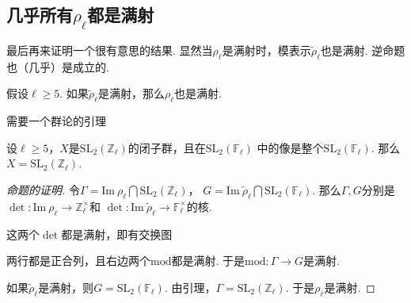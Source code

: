 \subsection{几乎所有\texorpdfstring{$\rho_{\ell}$}{rho ell}都是满射}

最后再来证明一个很有意思的结果.
显然当$\rho_{\ell}$是满射时，模表示$\tilde{\rho}_{\ell}$也是满射.
逆命题也（几乎）是成立的.

\begin{cprop}
    假设$\ell \geq 5$. 如果$\tilde{\rho}_{\ell}$是满射，那么$\rho_{\ell}$也是满射.
\end{cprop}

需要一个群论的引理
\begin{clem}
    设$\ell\geq 5$，$X$是$\mathrm{SL}_2(\mathbb{Z}_{\ell})$的闭子群，且在$\mathrm{SL}_2(\mathbb{F}_{\ell})$
    中的像是整个$\mathrm{SL}_2(\mathbb{F}_{\ell})$. 那么$X = \mathrm{SL}_2(\mathbb{Z}_{\ell})$.
\end{clem}

\begin{proof}[命题的证明]
    令$\Gamma = \mathrm{Im}\ \rho_{\ell}\bigcap \mathrm{SL}_2(\mathbb{Z}_{\ell})$，
    $G = \mathrm{Im}\ \tilde{\rho}_{\ell}\bigcap \mathrm{SL}_2(\mathbb{F}_{\ell})$.
    那么$\Gamma, G$分别是$\det: \mathrm{Im}\ \rho_{\ell} \to \mathbb{Z}_{\ell}^{\times}$和
    $\det: \mathrm{Im}\ \tilde{\rho}_{\ell}\to \mathbb{F}_{\ell}^{\times}$的核.

    这两个$\det$都是满射，即有交换图
    \begin{figure}[H]
        \centering
    \end{figure}
    两行都是正合列，且右边两个$\mathrm{mod}$都是满射.
    于是$\mathrm{mod}:\Gamma\to G$是满射.
    
    如果$\tilde{\rho}_{\ell}$是满射，则$G = \mathrm{SL}_2(\mathbb{F}_{\ell})$. 由引理，$\Gamma = \mathrm{SL}_2(\mathbb{Z}_{\ell})$. 于是$\rho_{\ell}$是满射.
\end{proof}
